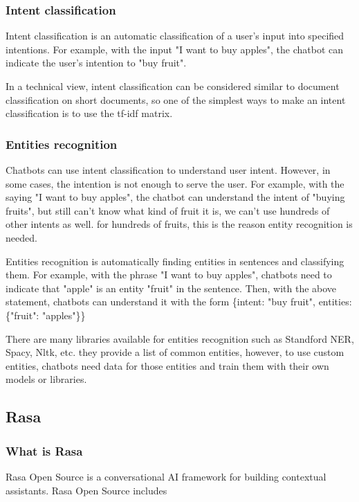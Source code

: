 \subsubsection{Intent classification}

Intent classification is an automatic classification of a user's input into specified intentions. For example, with the input "I want to buy apples", the chatbot can indicate the user's intention to "buy fruit".

In a technical view, intent classification can be considered similar to document classification on short documents, so one of the simplest ways to make an intent classification is to use the tf-idf matrix.

\subsubsection{Entities recognition}

Chatbots can use intent classification to understand user intent. However, in some cases, the intention is not enough to serve the user. For example, with the saying "I want to buy apples", the chatbot can understand the intent of "buying fruits", but still can't know what kind of fruit it is, we can't use hundreds of other intents as well. for hundreds of fruits, this is the reason entity recognition is needed.

Entities recognition is automatically finding entities in sentences and classifying them. For example, with the phrase "I want to buy apples", chatbots need to indicate that "apple" is an entity "fruit" in the sentence. Then, with the above statement, chatbots can understand it with the form \{intent: "buy fruit", entities: \{"fruit": "apples"\}\}

There are many libraries available for entities recognition such as Standford NER, Spacy, Nltk, etc. they provide a list of common entities, however, to use custom entities, chatbots need data for those entities and train them with their own models or libraries.

\subsection{Rasa}
\subsubsection{What is Rasa}

Rasa Open Source is a conversational AI framework for building contextual assistants.
Rasa Open Source includes

